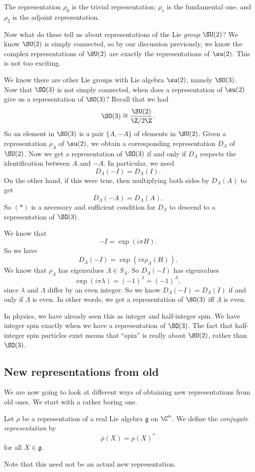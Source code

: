 \documentclass[a4paper]{article}
\begin{document}
The representation $\rho_0$ is the trivial representation; $\rho_1$ is the fundamental one, and $\rho_2$ is the adjoint representation.

Now what do these tell us about representations of the Lie \emph{group} $\SU(2)$? We know $\SU(2)$ is simply connected, so by our discussion previously, we know the complex representations of $\SU(2)$ are exactly the representations of $\su(2)$. This is not too exciting.

We know there are other Lie groups with Lie algebra $\su(2)$, namely $\SO(3)$. Now that $\SO(3)$ is not simply connected, when does a representation of $\su(2)$ give us a representation of $\SO(3)$? Recall that we had
\[
  \SO(3) \cong \frac{\SU(2)}{\Z/2\Z}.
\]
So an element in $\SO(3)$ is a pair $\{A, -A\}$ of elements in $\SU(2)$. Given a representation $\rho_\Lambda$ of $\su(2)$, we obtain a corresponding representation $D_\Lambda$ of $\SU(2)$. Now we get a representation of $\SO(3)$ if and only if $D_\Lambda$ respects the identification between $A$ and $-A$. In particular, we need
\[
  D_\Lambda(-I) = D_\Lambda(I).\tag{$*$}
\]
On the other hand, if this were true, then multiplying both sides by $D_\Lambda(A)$ to get
\[
  D_\Lambda(-A) = D_\Lambda(A).
\]
So $(*)$ is a necessary and sufficient condition for $D_\Lambda$ to descend to a representation of $\SO(3)$.

We know that
\[
  -I = \exp(i\pi H).
\]
So we have
\[
  D_\Lambda(-I) = \exp(i\pi \rho_\Lambda(H)).
\]
We know that $\rho_\Lambda$ has eigenvalues $\Lambda \in S_\Lambda$. So $D_\Lambda(-I)$ has eigenvalues
\[
  \exp(i\pi\lambda) = (-1)^\lambda = (-1)^\Lambda,
\]
since $\lambda$ and $\Lambda$ differ by an even integer. So we know $D_\Lambda(-I) = D_\Lambda (I)$ if and only if $\Lambda$ is even. In other words, we get a representation of $\SO(3)$ iff $\Lambda$ is even.

In physics, we have already seen this as integer and half-integer spin. We have integer spin exactly when we have a representation of $\SO(3)$. The fact that half-integer spin particles exist means that ``spin'' is really about $\SU(2)$, rather than $\SO(3)$.

\subsection{New representations from old}
We are now going to look at different ways of obtaining new representations from old ones. We start with a rather boring one.

\begin{defi}
  Let $\rho$ be a representation of a real Lie algebra $\mathfrak{g}$ on $\C^n$. We define the \emph{conjugate representation} by
  \[
    \bar{\rho}(X) = \rho(X)^*
  \]
  for all $X \in \mathfrak{g}$.
\end{defi}
Note that this need not be an actual new representation.
\end{document}
